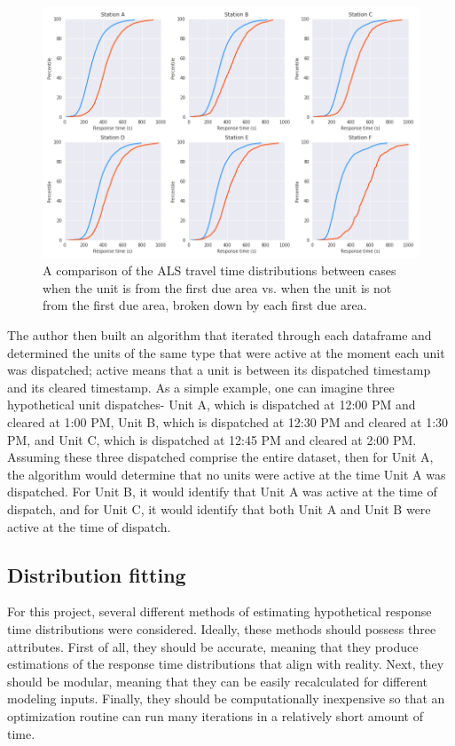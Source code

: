 \documentclass[article]{proc}
\begin{document}
\begin{figure}[!htb]
  \centering
  \includegraphics[width=16cm,keepaspectratio]{Figures/alsdiff.png}
  \caption{A comparison of the ALS travel time distributions between cases when the unit is from the first due area vs. when the unit is not from the first due area, broken down by each first due area.}
  \label{fig:raw_signal}
\end{figure}

The author then built an algorithm that iterated through each dataframe and determined the units of the same type that were active at the moment each unit was dispatched; active means that a unit is between its dispatched timestamp and its cleared timestamp.
As a simple example, one can imagine three hypothetical unit dispatches- Unit A, which is dispatched at 12:00 PM and cleared at 1:00 PM, Unit B, which is dispatched at 12:30 PM and cleared at 1:30 PM, and Unit C, which is dispatched at 12:45 PM and cleared at 2:00 PM. Assuming these three dispatched comprise the entire dataset, then for Unit A, the algorithm would determine that no units were active at the time Unit A was dispatched. For Unit B, it would identify that Unit A was active at the time of dispatch, and for Unit C, it would identify that both Unit A and Unit B were active at the time of dispatch. 







\subsection{Distribution fitting}
For this project, several different methods of estimating hypothetical response time distributions were considered. Ideally, these methods should possess three attributes. First of all, they should be accurate, meaning that they produce estimations of the response time distributions that align with reality. Next, they should be modular, meaning that they can be easily recalculated for different modeling inputs. Finally, they should be computationally inexpensive so that an optimization routine can run many iterations in a relatively short amount of time. 
\end{document}
